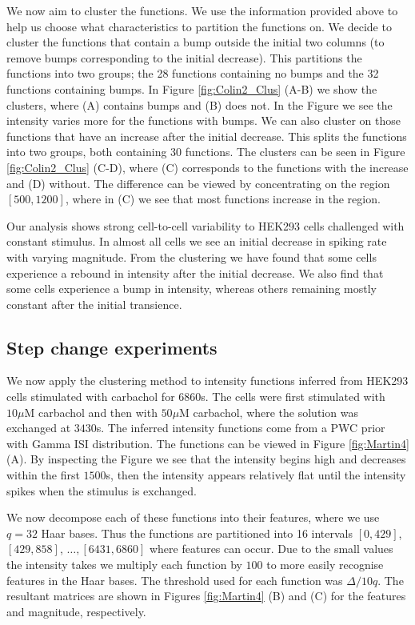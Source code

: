 \documentclass[../main.tex]{subfiles}
\begin{document}
We now aim to cluster the functions. We use the information provided above to help us choose what characteristics to partition the functions on. We decide to cluster the functions that contain a bump outside the initial two columns (to remove bumps corresponding to the initial decrease). This partitions the functions into two groups; the 28 functions containing no bumps  and the 32 functions containing bumps. In Figure \ref{fig:Colin2_Clus} (A-B) we show the clusters, where (A) contains bumps and (B) does not. In the Figure we see the intensity varies more for the functions with bumps.     
We can also cluster on those functions that have an increase after the initial decrease. This splits the functions into two groups, both containing 30 functions. The clusters can be seen in Figure \ref{fig:Colin2_Clus} (C-D), where (C) corresponds to the functions with the increase and (D) without. The difference can be viewed by concentrating on the region $[500,1200]$, where in (C) we see that most functions increase in the region.  
 
Our analysis shows strong cell-to-cell variability to HEK293 cells challenged with constant stimulus. In almost all cells we see an initial decrease in spiking rate with varying magnitude. From the clustering we have found that some cells experience a rebound in intensity after the initial decrease. We also find that some cells experience a bump in intensity, whereas others remaining mostly constant after the initial transience. 
 
\subsection{Step change experiments}
We now apply the clustering method to intensity functions inferred from HEK293 cells stimulated with carbachol for 6860s. The cells were first stimulated with $10\mu\mathrm{M}$ carbachol and then with $50\mu\mathrm{M}$ carbachol, where the solution was exchanged at $3430$s. The inferred  intensity functions come from a PWC prior with Gamma ISI distribution. The functions can be viewed in Figure \ref{fig:Martin4} (A). By inspecting the Figure we see that the intensity begins high and decreases within the first $1500$s, then the intensity appears relatively flat until the intensity spikes when the stimulus is exchanged. 


We now decompose each of these functions into their features, where we use $q = 32$ Haar bases. Thus the functions are partitioned into 16 intervals $[0,429]$, $[429,858]$, $\dots,  [6431,6860]$ where features can occur. Due to the small values the intensity takes we multiply each function by $100$ to more easily recognise features in the Haar bases. The threshold used for each function was $\Delta/10q$. The resultant matrices are shown in Figures \ref{fig:Martin4} (B) and (C) for the features and magnitude, respectively.
\end{document}
